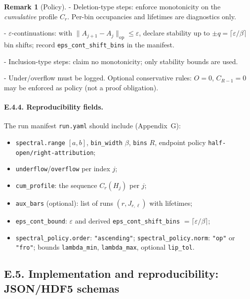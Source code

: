 \documentclass[11pt]{article}
\numberwithin{equation}{section}
\theoremstyle{plain}
\theoremstyle{definition}
\theoremstyle{remark}
\theoremstyle{plain}
\theoremstyle{definition}
\numberwithin{equation}{section}
\theoremstyle{definition}
\newtheorem{remark}[theorem]{Remark}
\numberwithin{equation}{section}
\theoremstyle{plain}
\theoremstyle{definition}
\theoremstyle{remark}
\begin{document}
\begin{remark}[Policy]
- Deletion-type steps: enforce monotonicity on the \emph{cumulative} profile \(C_r\). Per-bin occupancies and lifetimes are diagnostics only.

- \(\varepsilon\)-continuations: with \(\|A_{j+1}-A_j\|_{\mathrm{op}}\le \varepsilon\), declare stability up to \(\pm q=\lceil \varepsilon/\beta\rceil\) bin shifts; record \texttt{eps\_cont\_shift\_bins} in the manifest.

- Inclusion-type steps: claim no monotonicity; only stability bounds are used.

- Under/overflow must be logged. Optional conservative rules: \(O=0\), \(C_{R-1}=0\) may be enforced as policy (not a proof obligation).
\end{remark}

\paragraph{E.4.4. Reproducibility fields.}
The run manifest \texttt{run.yaml} should include (Appendix~G):
\begin{itemize}[leftmargin=1.25em]
  \item \texttt{spectral.range} \([a,b]\), \texttt{bin\_width} \(\beta\), \texttt{bins} \(R\), endpoint policy \texttt{half-open/right-attribution};
  \item \texttt{underflow}/\texttt{overflow} per index \(j\);
  \item \texttt{cum\_profile}: the sequence \(C_r(H_j)\) per \(j\);
  \item \texttt{aux\_bars} (optional): list of runs \((r,J_{r,\ell})\) with lifetimes;
  \item \texttt{eps\_cont\_bound}: \(\varepsilon\) and derived \texttt{eps\_cont\_shift\_bins} \(= \lceil \varepsilon/\beta\rceil\);
  \item \texttt{spectral\_policy.order}: \texttt{"ascending"}; \texttt{spectral\_policy.norm}: \texttt{"op"} or \texttt{"fro"}; bounds \texttt{lambda\_min}, \texttt{lambda\_max}, optional \texttt{lip\_tol}.
\end{itemize}

\subsection*{E.5. Implementation and reproducibility: JSON/HDF5 schemas}
\end{document}
